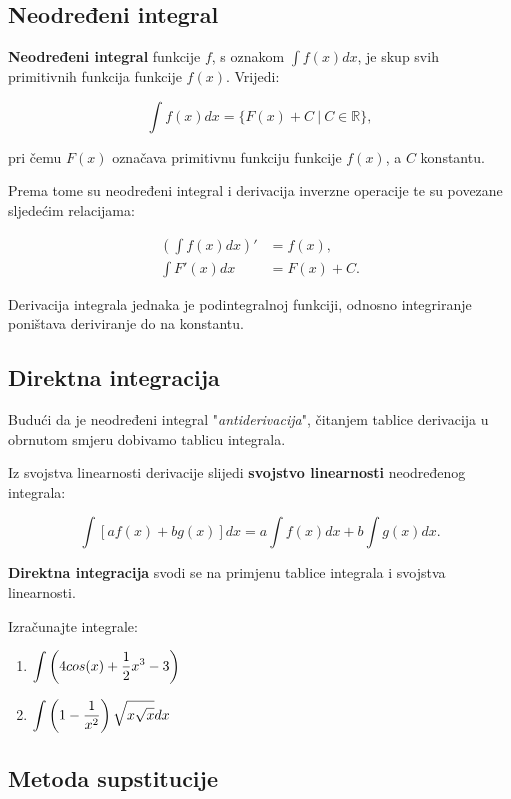\subsection{Neodređeni integral}

\textbf{Neodređeni integral} funkcije $f$, s oznakom $\int f(x)dx$, je skup svih
primitivnih funkcija funkcije $f(x)$. Vrijedi:

$$
\int f(x)dx = \{F(x) + C\ |\ C\in\mathbb{R}\},
$$

pri čemu $F(x)$ označava primitivnu funkciju funkcije $f(x)$, a $C$ konstantu.

Prema tome su neodređeni integral i derivacija inverzne operacije te su povezane
sljedećim relacijama:

\begin{align*}
    \left(\int f(x) dx\right)' &= f(x),\\
    \int F'(x) dx &= F(x) + C.
\end{align*}

Derivacija integrala jednaka je podintegralnoj funkciji, odnosno integriranje
poništava deriviranje do na konstantu.

\subsection{Direktna integracija}

Budući da je neodređeni integral "\textit{antiderivacija}", čitanjem tablice
derivacija u obrnutom smjeru dobivamo tablicu integrala.

Iz svojstva linearnosti derivacije slijedi \textbf{svojstvo linearnosti}
neodređenog integrala:

$$
\int \left[af(x) + bg(x)\right] dx = a \int f(x) dx + b \int g(x) dx.
$$

\textbf{Direktna integracija} svodi se na primjenu tablice integrala i svojstva
linearnosti.

\begin{example}
    Izračunajte integrale:

    \begin{enumerate}
        \item $\displaystyle \int \left(4 cos(x) + {1\over 2} x^3 - 3\right)$
        \item $\displaystyle \int \left(1-{1\over x^2}\right)
        \sqrt{x\sqrt{x}}dx$
    \end{enumerate}
\end{example}

\subsection{Metoda supstitucije}

